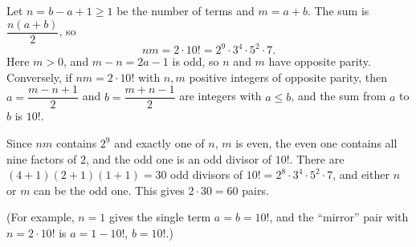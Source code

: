 Let $n=b-a+1\ge1$ be the number of terms and $m=a+b$. The sum is $\dfrac{n(a+b)}{2}$, so
\[nm=2\cdot10!=2^9\cdot3^4\cdot5^2\cdot7.\]
Here $m>0$, and $m-n=2a-1$ is odd, so $n$ and $m$ have opposite parity. Conversely, if $nm=2\cdot10!$ with $n,m$ positive integers of opposite parity, then $a=\dfrac{m-n+1}{2}$ and $b=\dfrac{m+n-1}{2}$ are integers with $a\le b$, and the sum from $a$ to $b$ is $10!$.

Since $nm$ contains $2^9$ and exactly one of $n$, $m$ is even, the even one contains all nine factors of $2$, and the odd one is an odd divisor of $10!$. There are $(4+1)(2+1)(1+1)=30$ odd divisors of $10!=2^8\cdot3^4\cdot5^2\cdot7$, and either $n$ or $m$ can be the odd one. This gives $2\cdot30=\boxed{60}$ pairs.

(For example, $n=1$ gives the single term $a=b=10!$, and the ``mirror'' pair with $n=2\cdot10!$ is $a=1-10!$, $b=10!$.)
